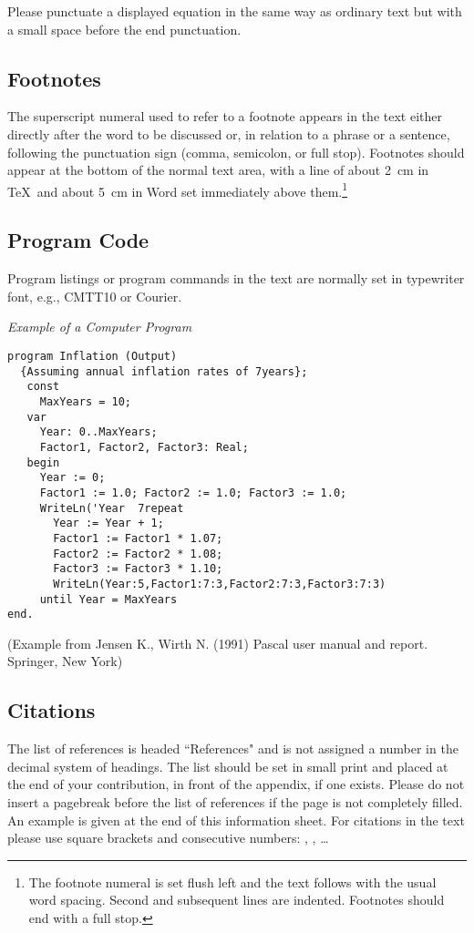 \documentclass[runningheads]{llncs}
\begin{document}
Please punctuate a displayed equation in the same way as ordinary
text but with a small space before the end punctuation.

\subsection{Footnotes}

The superscript numeral used to refer to a footnote appears in the text
either directly after the word to be discussed or, in relation to a
phrase or a sentence, following the punctuation sign (comma,
semicolon, or full stop). Footnotes should appear at the bottom of
the
normal text area, with a line of about 2~cm in \TeX\ and about 5~cm in
Word set
immediately above them.\footnote{The footnote numeral is set flush left
and the text follows with the usual word spacing. Second and subsequent
lines are indented. Footnotes should end with a full stop.}


\subsection{Program Code}

Program listings or program commands in the text are normally set in
typewriter font, e.g., CMTT10 or Courier.

\noindent
{\it Example of a Computer Program}
\begin{verbatim}
program Inflation (Output)
  {Assuming annual inflation rates of 7years};
   const
     MaxYears = 10;
   var
     Year: 0..MaxYears;
     Factor1, Factor2, Factor3: Real;
   begin
     Year := 0;
     Factor1 := 1.0; Factor2 := 1.0; Factor3 := 1.0;
     WriteLn('Year  7repeat
       Year := Year + 1;
       Factor1 := Factor1 * 1.07;
       Factor2 := Factor2 * 1.08;
       Factor3 := Factor3 * 1.10;
       WriteLn(Year:5,Factor1:7:3,Factor2:7:3,Factor3:7:3)
     until Year = MaxYears
end.
\end{verbatim}
\noindent
{\small (Example from Jensen K., Wirth N. (1991) Pascal user manual and
report. Springer, New York)}



\subsection{Citations}

The list of references is headed ``References" and is not assigned a
number
in the decimal system of headings. The list should be set in small print
and placed at the end of your contribution, in front of the appendix,
if one exists.
Please do not insert a pagebreak before the list of references if the
page is not completely filled.
An example is given at the
end of this information sheet. For citations in the text please use
square brackets and consecutive numbers: \cite{Alpher02},
\cite{Alpher03}, \cite{Alpher04} \dots
\end{document}
